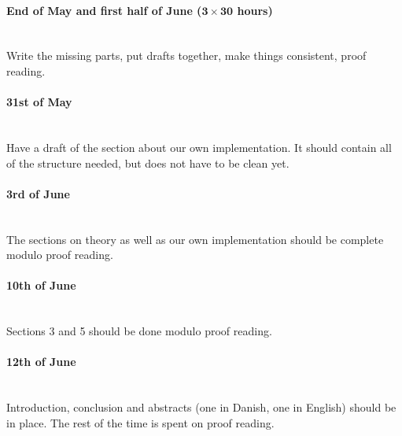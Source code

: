 \documentclass{article}
\newcommand{\timeest}[1]{$\mathbf{#1}$}%
\begin{document}
\paragraph{End of May and first half of June (\timeest{3\times 30} hours)}~\\\noindent
Write the missing parts, put drafts together, make things consistent, proof reading.

\paragraph{31st of May}~\\\noindent
Have a draft of the section about our own implementation. It should contain all of
the structure needed, but does not have to be clean yet.

\paragraph{3rd of June}~\\\noindent
The sections on theory as well as our own implementation should be complete modulo
proof reading.

\paragraph{10th of June}~\\\noindent
Sections 3 and 5 should be done modulo proof reading.

\paragraph{12th of June}~\\\noindent
Introduction, conclusion and abstracts (one in Danish, one in English) should be in
place. The rest of the time is spent on proof reading. 
\end{document}
